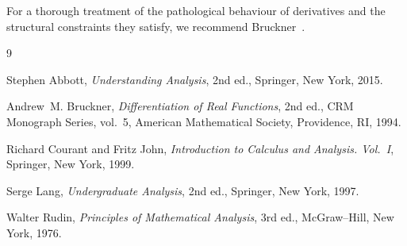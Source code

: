 \documentclass[11pt,a4paper]{amsart}
\theoremstyle{remark}
\begin{document}
For a thorough treatment of the pathological behaviour of derivatives and the structural constraints they satisfy, we recommend Bruckner~\cite{bruckner}.

\begin{thebibliography}{9}

Stephen Abbott,
\emph{Understanding Analysis},
2nd ed.,
Springer, New York, 2015.

Andrew~M. Bruckner,
\emph{Differentiation of Real Functions},
2nd ed.,
CRM Monograph Series, vol.~5,
American Mathematical Society, Providence, RI, 1994.

Richard Courant and Fritz John,
\emph{Introduction to Calculus and Analysis. Vol.~I},
Springer, New York, 1999.

Serge Lang,
\emph{Undergraduate Analysis},
2nd ed.,
Springer, New York, 1997.

Walter Rudin,
\emph{Principles of Mathematical Analysis},
3rd ed.,
McGraw--Hill, New York, 1976.

\end{thebibliography}
\end{document}
